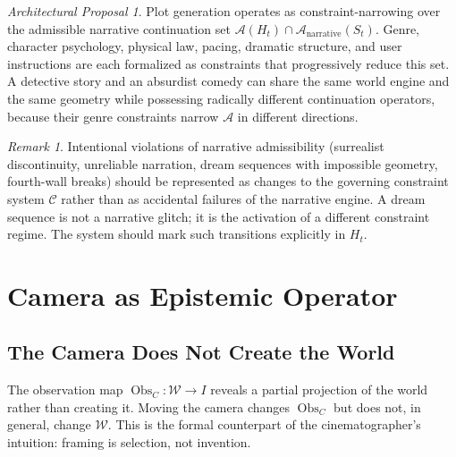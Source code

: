 \documentclass[12pt,a4paper]{article}
\theoremstyle{plain}
\theoremstyle{definition}
\theoremstyle{remark}
\newtheorem{remark}[theorem]{Remark}
\newtheorem{proposal}[theorem]{Architectural Proposal}
\DeclareMathOperator{\Obs}{Obs}
\begin{document}
\begin{proposal}
Plot generation operates as constraint-narrowing over the admissible narrative continuation set $\mathcal{A}(H_t) \cap \mathcal{A}_{\mathrm{narrative}}(S_t)$. Genre, character psychology, physical law, pacing, dramatic structure, and user instructions are each formalized as constraints that progressively reduce this set. A detective story and an absurdist comedy can share the same world engine and the same geometry while possessing radically different continuation operators, because their genre constraints narrow $\mathcal{A}$ in different directions.
\end{proposal}

\begin{remark}
Intentional violations of narrative admissibility (surrealist discontinuity, unreliable narration, dream sequences with impossible geometry, fourth-wall breaks) should be represented as changes to the governing constraint system $\mathcal{C}$ rather than as accidental failures of the narrative engine. A dream sequence is not a narrative glitch; it is the activation of a different constraint regime. The system should mark such transitions explicitly in $H_t$.
\end{remark}

\section{Camera as Epistemic Operator}
\label{sec:camera}

\subsection{The Camera Does Not Create the World}

The observation map $\Obs_C : \mathcal{W} \to I$ reveals a partial projection of the world rather than creating it. Moving the camera changes $\Obs_C$ but does not, in general, change $\mathcal{W}$. This is the formal counterpart of the cinematographer's intuition: framing is selection, not invention.
\end{document}
